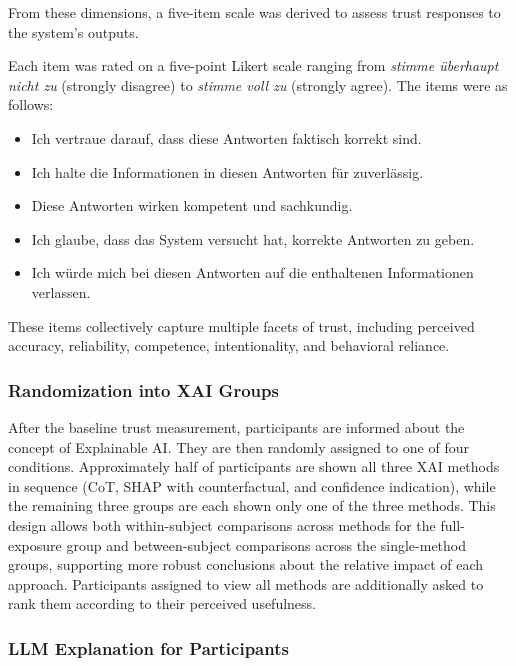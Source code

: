 From these dimensions, a five-item scale was derived to assess trust responses to the system's outputs.

Each item was rated on a five-point Likert scale ranging from \textit{stimme überhaupt nicht zu} (strongly disagree) to \textit{stimme voll zu} (strongly agree). The items were as follows:

\begin{itemize}
    \item Ich vertraue darauf, dass diese Antworten faktisch korrekt sind.
    \item Ich halte die Informationen in diesen Antworten für zuverlässig.
    \item Diese Antworten wirken kompetent und sachkundig.
    \item Ich glaube, dass das System versucht hat, korrekte Antworten zu geben.
    \item Ich würde mich bei diesen Antworten auf die enthaltenen Informationen verlassen.
\end{itemize}

These items collectively capture multiple facets of trust, including perceived accuracy, reliability, competence, intentionality, and behavioral reliance.

\subsubsection{Randomization into XAI Groups}

After the baseline trust measurement, participants are informed about the concept of Explainable AI. They are then randomly assigned to one of four conditions. Approximately half of participants are shown all three XAI methods in sequence (CoT, SHAP with counterfactual, and confidence indication), while the remaining three groups are each shown only one of the three methods. This design allows both within-subject comparisons across methods for the full-exposure group and between-subject comparisons across the single-method groups, supporting more robust conclusions about the relative impact of each approach. Participants assigned to view all methods are additionally asked to rank them according to their perceived usefulness.

\subsubsection{LLM Explanation for Participants}

